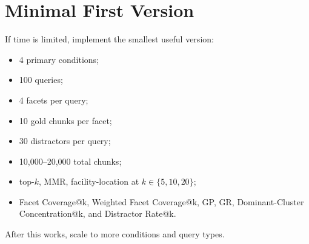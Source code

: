\documentclass[11pt,a4paper]{article}
\begin{document}
\section{Minimal First Version}

If time is limited, implement the smallest useful version:

\begin{itemize}[leftmargin=*]
	\item 4 primary conditions;
	\item 100 queries;
	\item 4 facets per query;
	\item 10 gold chunks per facet;
	\item 30 distractors per query;
	\item 10,000--20,000 total chunks;
	\item top-$k$, MMR, facility-location at $k \in \{5,10,20\}$;
	\item Facet Coverage@k, Weighted Facet Coverage@k, GP, GR, Dominant-Cluster Concentration@k, and Distractor Rate@k.
\end{itemize}

After this works, scale to more conditions and query types.


\end{document}
